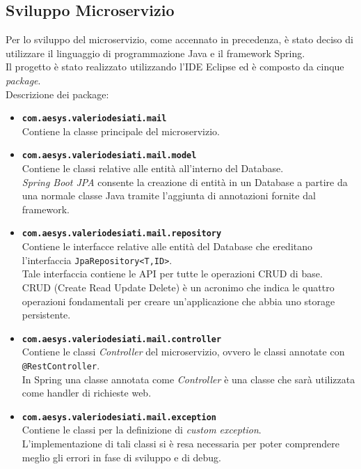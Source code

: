 \subsection{Sviluppo Microservizio}\label{sec:sviluppomicroservizio}
Per lo sviluppo del microservizio, come accennato in precedenza, è stato deciso di utilizzare il linguaggio di programmazione Java e il framework Spring.\\
Il progetto è stato realizzato utilizzando l'IDE Eclipse ed è composto da cinque \emph{package}.\\
Descrizione dei package:
\begin{itemize}
	\item \textbf{\texttt{com.aesys.valeriodesiati.mail}}\\ Contiene la classe principale del microservizio.
	\item \textbf{\texttt{com.aesys.valeriodesiati.mail.model}}\\ Contiene le classi relative alle entità all'interno del Database.\\
	\emph{Spring Boot JPA} consente la creazione di entità in un Database a partire da una normale classe Java tramite l'aggiunta di annotazioni fornite dal framework.
	\item \textbf{\texttt{com.aesys.valeriodesiati.mail.repository}}\\ Contiene le interfacce relative alle entità del Database che ereditano l'interfaccia 
	\texttt{JpaRepository<T,ID>}.\\ Tale interfaccia contiene le API per tutte le operazioni CRUD di base.\\ CRUD (Create Read Update Delete) è un acronimo 
	che indica le quattro operazioni fondamentali per creare un'applicazione che abbia uno storage persistente.
	\item \textbf{\texttt{com.aesys.valeriodesiati.mail.controller}}\\ Contiene le classi \emph{Controller} del microservizio, ovvero le classi annotate con 
	\texttt{@RestController}.\\ In Spring una classe annotata come \emph{Controller} è una classe che sarà utilizzata come handler di richieste web.
	\item \textbf{\texttt{com.aesys.valeriodesiati.mail.exception}}\\ Contiene le classi per la definizione di \emph{custom exception}.\\ L'implementazione 
	di tali classi si è resa necessaria per poter comprendere meglio gli errori in fase di sviluppo e di debug.\\
\end{itemize}


